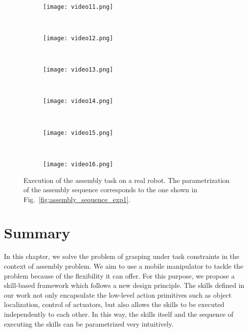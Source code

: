 \begin{figure}[!htbp]
    ~
    \begin{subfigure}[t]{0.2\textwidth}
        \texttt{[image: video11.png]}
	    \caption{}
        \label{fig:video:k}   
    \end{subfigure}
    ~
    \begin{subfigure}[t]{0.2\textwidth}
        \texttt{[image: video12.png]}
        \caption{}
        \label{fig:video:l}   
    \end{subfigure}
    ~
    \begin{subfigure}[t]{0.2\textwidth}
        \texttt{[image: video13.png]}
	    \caption{}    
        \label{fig:video:m}   
    \end{subfigure}
    ~
    \begin{subfigure}[t]{0.2\textwidth}
        \texttt{[image: video14.png]}
\caption{}    
        \label{fig:video:n}   
    \end{subfigure}
    ~
    \begin{subfigure}[t]{0.2\textwidth}
        \texttt{[image: video15.png]}
\caption{}  
        \label{fig:video:o}   
    \end{subfigure}
    ~
    \begin{subfigure}[t]{0.2\textwidth}
        \texttt{[image: video16.png]}
\caption{}  
    \label{fig:video:p}   
    \end{subfigure}
   \caption{Execution of the assembly task on a real robot. The parametrization of the assembly sequence corresponds to the one shown in Fig.~\ref{fig:assembly_sequence_exp1}. }
    \label{fig:video}
 \end{figure} 



\section{Summary}
In this chapter, we solve the problem of grasping under task constraints in the context of assembly problem. We aim to use a mobile manipulator to tackle the problem because of the flexibility it can offer. For this purpose, we propose a skill-based framework which  follows a new design principle. The skills defined in our work not only encapsulate the low-level action primitives such as object localization, control of actuators, but also allows the skills to be executed independently to each other. In this way, the skills itself and the sequence of executing the skills can be parametrized very intuitively.  

